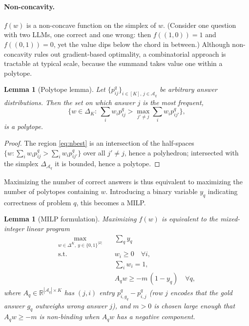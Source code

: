 \documentclass{article} %
\newtheorem{lemma}[theorem]{Lemma}
\begin{document}
\paragraph{Non-concavity.} $f(w)$ is a non-concave function on the simplex of
$w$. (Consider one question with two LLMs, one correct and one wrong: then
$f((1,0))=1$ and $f((0,1))=0$, yet the value dips below the chord in between.)
Although non-concavity rules out gradient-based optimality, a combinatorial
approach is tractable at typical scale, because the summand takes value one
within a polytope.

\begin{lemma}[Polytope lemma]
\label{lem:polytope}
Let $\{p_{ij}^q\}_{i\in[K],\,j\in\mathcal{A}_q}$ be arbitrary answer
distributions. Then the set on which answer $j$ is the most frequent,
\begin{equation}
\label{eq:nbest}
\Big\{ w \in \Delta_K:\ \sum_i w_i p_{ij}^q > \max_{j'\ne j} \sum_i w_i p_{ij'}^q \Big\},
\end{equation}
is a polytope.
\end{lemma}
\begin{proof}
The region \eqref{eq:nbest} is an intersection of the half-spaces
$\{w:\sum_i w_i p_{ij}^q > \sum_i w_i p_{ij'}^q\}$ over all $j'\ne j$, hence a
polyhedron; intersected with the simplex $\Delta_{\mathcal{A}_q}$ it is bounded,
hence a polytope.
\end{proof}

Maximizing the number of correct answers is thus equivalent to maximizing the
number of polytopes containing $w$. Introducing a binary variable $y_q$
indicating correctness of problem $q$, this becomes a MILP.

\begin{lemma}[MILP formulation]
\label{lem:milp}
Maximizing $f(w)$ is equivalent to the mixed-integer linear program
\begin{align}
\max_{w \in \Delta^K,\ y \in \{0,1\}^{|\mathcal{Q}|}} \quad & \sum_q y_q \\
\mathrm{s.t.}\quad & w_i \ge 0 \quad \forall i, \\
& \textstyle\sum_i w_i = 1, \\
& A_q w \ge -m\,(1 - y_q) \quad \forall q, \label{eq:milp-constraint}
\end{align}
where $A_q \in \mathbb{R}^{|\mathcal{A}_q|\times K}$ has $(j,i)$ entry
$p_{i,g_q}^q - p_{i,j}^q$ (row $j$ encodes that the gold answer $g_q$ outweighs
wrong answer $j$), and $m>0$ is chosen large enough that $A_q w \ge -m$ is
non-binding when $A_q w$ has a negative component.
\end{lemma}
\end{document}
